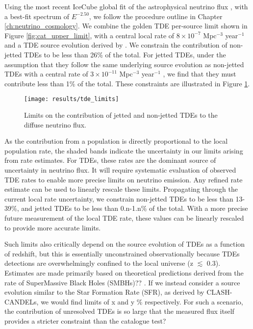 Using the most recent IceCube global fit of the astrophysical neutrino flux , with a best-fit spectrum of $E^{-2.50}$, we follow the procedure outline in Chapter \ref{ch:neutrino_cosmology}. We combine the golden TDE per-source limit shown in Figure \ref{fig:cat_upper_limit}, with a central local rate of $8 \times 10^{-7}$ Mpc$^{-3}$ year$^{-1}$  and a TDE source evolution derived by \cite{Sun:2015bda}. We constrain the contribution of non-jetted TDEs to be less than 26\% of the total. For jetted TDEs, under the assumption that they follow the same underlying source evolution as non-jetted TDEs with a central rate of $3 \times 10^{-11}$ Mpc$^{-3}$ year$^{-1}$ , we find that they must contribute less than 1\% of the total.  These constraints are illustrated in Figure \ref{fig:DiffuseFlux}. 

\begin{figure}[!ht]
	\centering \texttt{[image: results/tde\_limits]}
	\caption{Limits on the contribution of jetted and non-jetted TDEs to the diffuse neutrino flux.}
	\label{fig:DiffuseFlux}
\end{figure}

As the contribution from a population is directly proportional to the local population rate, the shaded bands indicate the uncertainty in our limits arising from rate estimates. For TDEs, these rates are the dominant source of uncertainty in neutrino flux. It will require systematic evaluation of observed TDE rates to enable more precise limits on neutrino emission. Any refined rate estimate can be used to linearly rescale these limits. Propagating through the current local rate uncertainty, we constrain non-jetted TDEs to be less than 13-39\%, and jetted TDEs to be less than 0.n-1.n\% of the total. With a more precise future measurement of the local TDE rate, these values can be linearly rescaled to provide more accurate limits.

Such limits also critically depend on the source evolution of TDEs as a function of redshift, but this is essentially unconstrained observationally because TDEs detections are overwhelmingly confined to the local universe (z $\lesssim$ 0.3). Estimates are made primarily based on theoretical predictions derived from the rate of SuperMassive Black Holes (SMBHs)?? \cite{Sun:2015bda}. If we instead consider a source evolution similar to the Star Formation Rate (SFR), as derived by CLASH-CANDELs, we would find limits of x and y \% respectively. For such a scenario, the contribution of unresolved TDEs is so large that the measured flux itself provides a stricter constraint than the catalogue test?

